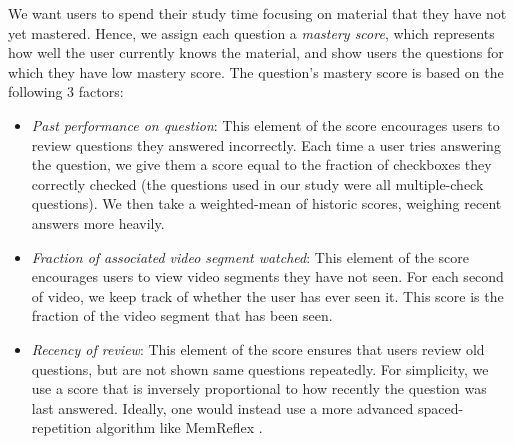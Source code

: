 \documentclass{sigchi}
\begin{document}
We want users to spend their study time focusing on material that they have not yet mastered. Hence, we assign each question a \emph{mastery score}, which represents how well the user currently knows the material, and show users the questions for which they have low mastery score. The question's mastery score is based on the following 3 factors:

\begin{itemize}
\item \emph{Past performance on question}: This element of the score encourages users to review questions they answered incorrectly. Each time a user tries answering the question, we give them a score equal to the fraction of checkboxes they correctly checked (the questions used in our study were all multiple-check questions). We then take a weighted-mean of historic scores, weighing recent answers more heavily. %
\item \emph{Fraction of associated video segment watched}: This element of the score encourages users to view video segments they have not seen. For each second of video, we keep track of whether the user has ever seen it. This score is the fraction of the video segment that has been seen. %
\item \emph{Recency of review}:  This element of the score ensures that users review old questions, but are not shown same questions repeatedly. For simplicity, we use a score that is inversely proportional to how recently the question was last answered. Ideally, one would instead use a more advanced spaced-repetition algorithm like MemReflex \cite{memreflex}. %
\end{itemize}
\end{document}
